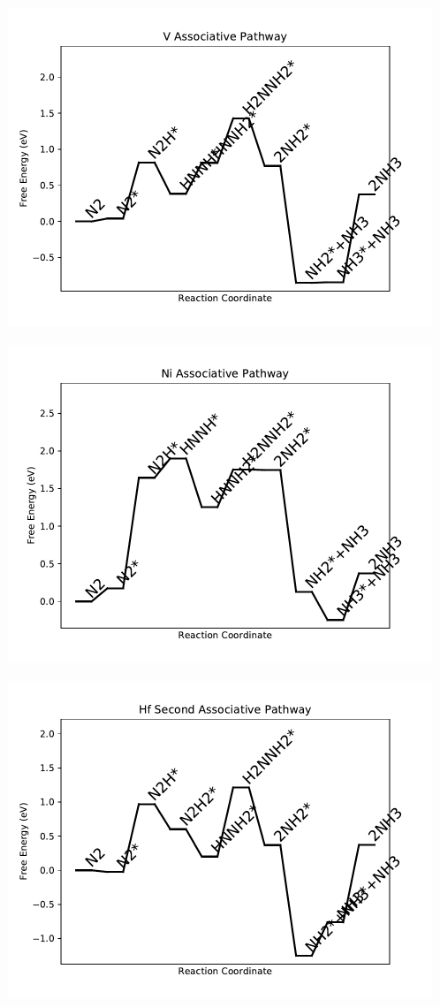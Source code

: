 \begin{figure}
\centering
\includegraphics[width=0.8\linewidth]{data/plots/V_associative.pdf}
\end{figure}

\begin{figure}
\centering
\includegraphics[width=0.8\linewidth]{data/plots/Ni_associative.pdf}
\end{figure}

\begin{figure}
\centering
\includegraphics[width=0.8\linewidth]{data/plots/Hf_associative_2.pdf}
\end{figure}

